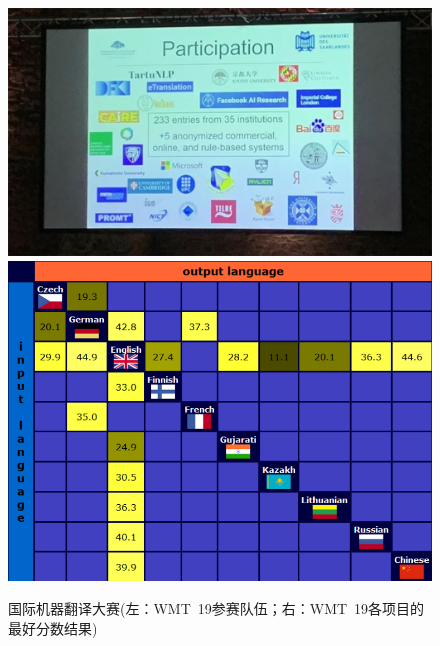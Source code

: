 \begin{figure}[htp]
    \centering
\includegraphics[scale=0.3]{./Chapter1/Figures/figure-wmt-participation.jpg}
\includegraphics[scale=0.3]{./Chapter1/Figures/figure-wmt-bestresults.jpg}
\setlength{\belowcaptionskip}{-1.5em}
    \caption{国际机器翻译大赛(左：WMT\ 19参赛队伍；右：WMT\ 19各项目的最好分数结果)}
    \label{fig:1-6}
\end{figure}


\sectionnewpage
